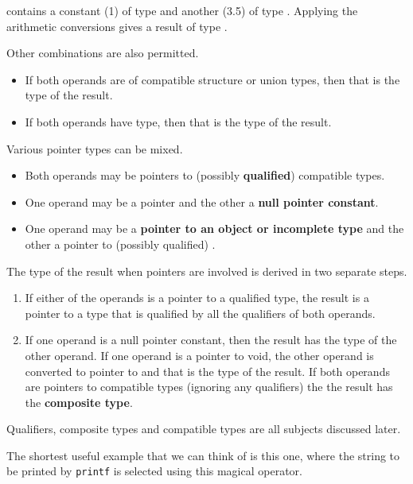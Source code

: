    contains a constant (1) of type \kint{} and
    another (3.5) of type \double. Applying the arithmetic
    conversions gives a result of type \double.


   Other combinations are also permitted.


   \begin{itemize}
    \item If both operands are of compatible structure or union types, then that
     is the type of the result.
    \item If both operands have \void{} type, then that is the type of
     the result.
   \end{itemize}

   Various pointer types can be mixed.


   \begin{itemize}
    \item Both operands may be pointers to (possibly \textbf{qualified})
     compatible types.

    \item One operand may be a pointer and the other a \textbf{null pointer
     constant}.

    \item One operand may be a \textbf{pointer to an object or incomplete
     type} and the other a pointer to (possibly qualified)
     \void.
   \end{itemize}

   The type of the result when pointers are involved is derived in two
    separate steps.


   \begin{enumerate}
    \item If either of the operands is a pointer to a qualified type, the result
     is a pointer to a type that is qualified by all the qualifiers of both
     operands.

    \item If one operand is a null pointer constant, then the result has the
     type of the other operand. If one operand is a pointer to void, the other
     operand is converted to pointer to \void{} and that is the type
     of the result. If both operands are pointers to compatible types
     (ignoring any qualifiers) the the result has the \textbf{composite
     type}.
   \end{enumerate}

   Qualifiers, composite types and compatible types are all subjects
    discussed later.


   The shortest useful example that we can think of is this one, where the
    string to be printed by \texttt{printf} is selected using this magical
    operator.


